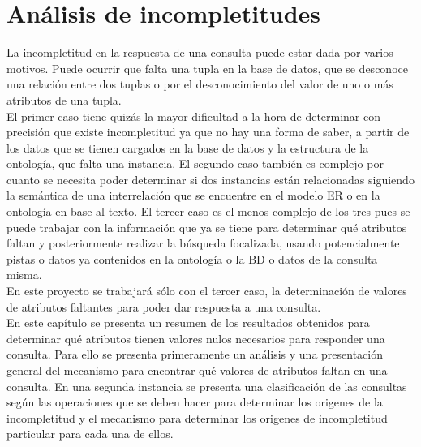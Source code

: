 \chapter{Análisis de incompletitudes} \label{chap:analisisOrigenIncompletitud}

\newcommand{\RESULT}[3]{
	\text{#1} \\[5pt]
}
\newcommand{\QUERY}[1]{
	\begin{center}
	\emph{#1}
	\end{center}
}


La incompletitud en la respuesta de una consulta puede estar dada por varios motivos. Puede ocurrir que falta una tupla en la base de datos, que se desconoce una relación entre dos tuplas o por el desconocimiento del valor de uno o más atributos de una tupla. \\

El primer caso tiene quizás la mayor dificultad a la hora de determinar con precisión que existe incompletitud ya que no hay una forma de saber, a partir de los datos que se tienen cargados en la base de datos y la estructura de la ontología, que falta una instancia. El segundo caso también es complejo por cuanto se necesita poder determinar si dos instancias están relacionadas siguiendo la semántica de una interrelación que se encuentre en el modelo ER o en la ontología en base al texto. El tercer caso es el menos complejo de los tres pues se puede trabajar con la información que ya se tiene para determinar qué atributos faltan y posteriormente realizar la búsqueda focalizada, usando potencialmente pistas o datos ya contenidos en la ontología o la BD o datos de la consulta misma.\\

En este proyecto se trabajará sólo con el tercer caso, la determinación de valores de atributos faltantes para poder dar respuesta a una consulta.\\

En este capítulo se presenta un resumen de los resultados obtenidos para determinar qué atributos tienen valores nulos necesarios para responder una consulta. Para ello se presenta primeramente un análisis y una presentación general del mecanismo para encontrar qué valores de atributos faltan en una consulta. En una segunda instancia se presenta una clasificación de las consultas según las operaciones que se deben hacer para determinar los origenes de la incompletitud y el mecanismo para determinar los origenes de incompletitud particular para cada una de ellos.\\

